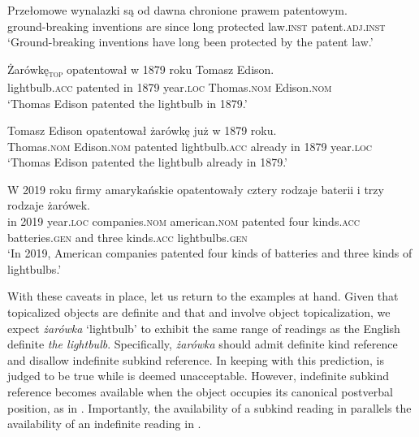 \documentclass[output=paper]{langscibook}
\begin{document}
\ea \label{ex:lightbulb_kind}
\gll
Przełomowe wynalazki są od dawna chronione prawem patentowym.\\
ground-breaking inventions are since long protected law.\textsc{inst} patent.\textsc{adj.inst}\\
\glt `Ground-breaking inventions have long been protected by the patent law.'

\ea \label{ex:lightbulb_kind_1}
\gll
Żarówkę\textsubscript{\textsc{top}} opatentował w 1879 roku Tomasz Edison.\\
lightbulb.\textsc{acc} patented in 1879 year.\textsc{loc} Thomas.\textsc{nom} Edison.\textsc{nom}\\
\glt `Thomas Edison patented the lightbulb in 1879.'

\ex \label{ex:lightbulb_kind_2}
\gll
Tomasz Edison opatentował żarówkę już w 1879 roku.\\
Thomas.\textsc{nom} Edison.\textsc{nom} patented lightbulb.\textsc{acc} already in 1879 year.\textsc{loc}\\
\glt `Thomas Edison patented the lightbulb already in 1879.'
\z \z

\ea \label{ex:lightbulb_subkind}
\gll
W 2019 roku firmy amarykańskie opatentowały cztery rodzaje baterii i trzy rodzaje żarówek.\\
in 2019 year.\textsc{loc} companies.\textsc{nom} american.\textsc{nom} patented four kinds.\textsc{acc} batteries.\textsc{gen} and three kinds.\textsc{acc} lightbulbs.\textsc{gen}\\
\glt `In 2019, American companies patented four kinds of batteries and three kinds of lightbulbs.'


\z \z

\noindent
With these caveats in place, let us return to the examples at hand. Given that topicalized objects are definite and that  and  involve object topicalization, we expect \textit{żarówka} `lightbulb' to exhibit the same range of readings as the English definite \textit{the lightbulb}. Specifically, \textit{żarówka} should admit definite kind reference and disallow indefinite subkind reference. In keeping with this prediction,  is judged to be true while  is deemed unacceptable. However, indefinite subkind reference becomes available when the object occupies its canonical postverbal position, as in . Importantly, the availability of a subkind reading in  parallels the availability of an indefinite reading in .
\end{document}
